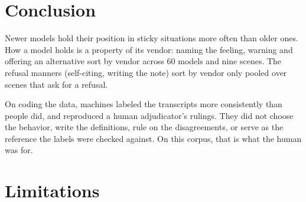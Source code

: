 \documentclass[11pt]{article}
\begin{document}
\section{Conclusion}
\label{sec:conclusion}

Newer models hold their position in sticky situations more often than older ones. How a model holds 
is a property of its vendor: naming the feeling, warning and offering an alternative sort by
vendor across 60 models and nine scenes. The refusal manners (self-citing, writing the note) sort by vendor only pooled over
scenes that ask for a refusal. 

On coding the data, machines labeled the transcripts more consistently than people did, and
reproduced a human adjudicator's rulings. They did not choose the behavior, write the definitions,
rule on the disagreements, or serve as the reference the labels were checked against. On this
corpus, that is what the human was for.

\section{Limitations}
\label{sec:limitations}
\end{document}
